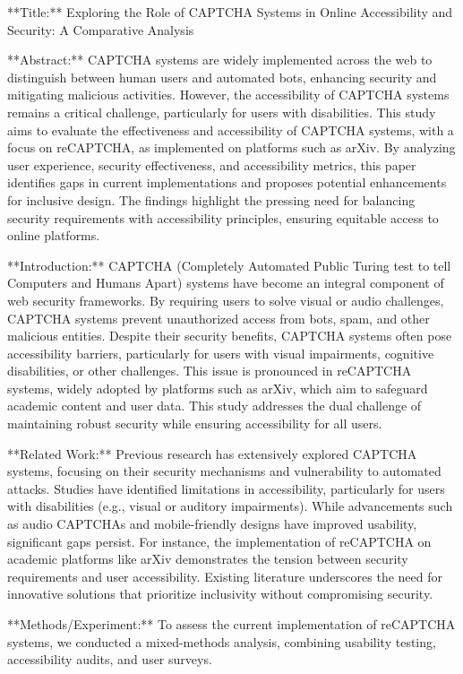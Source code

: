 **Title:** Exploring the Role of CAPTCHA Systems in Online Accessibility and Security: A Comparative Analysis  

**Abstract:**  
CAPTCHA systems are widely implemented across the web to distinguish between human users and automated bots, enhancing security and mitigating malicious activities. However, the accessibility of CAPTCHA systems remains a critical challenge, particularly for users with disabilities. This study aims to evaluate the effectiveness and accessibility of CAPTCHA systems, with a focus on reCAPTCHA, as implemented on platforms such as arXiv. By analyzing user experience, security effectiveness, and accessibility metrics, this paper identifies gaps in current implementations and proposes potential enhancements for inclusive design. The findings highlight the pressing need for balancing security requirements with accessibility principles, ensuring equitable access to online platforms.

**Introduction:**  
CAPTCHA (Completely Automated Public Turing test to tell Computers and Humans Apart) systems have become an integral component of web security frameworks. By requiring users to solve visual or audio challenges, CAPTCHA systems prevent unauthorized access from bots, spam, and other malicious entities. Despite their security benefits, CAPTCHA systems often pose accessibility barriers, particularly for users with visual impairments, cognitive disabilities, or other challenges. This issue is pronounced in reCAPTCHA systems, widely adopted by platforms such as arXiv, which aim to safeguard academic content and user data. This study addresses the dual challenge of maintaining robust security while ensuring accessibility for all users.

**Related Work:**  
Previous research has extensively explored CAPTCHA systems, focusing on their security mechanisms and vulnerability to automated attacks. Studies have identified limitations in accessibility, particularly for users with disabilities (e.g., visual or auditory impairments). While advancements such as audio CAPTCHAs and mobile-friendly designs have improved usability, significant gaps persist. For instance, the implementation of reCAPTCHA on academic platforms like arXiv demonstrates the tension between security requirements and user accessibility. Existing literature underscores the need for innovative solutions that prioritize inclusivity without compromising security.

**Methods/Experiment:**  
To assess the current implementation of reCAPTCHA systems, we conducted a mixed-methods analysis, combining usability testing, accessibility audits, and user surveys.  

